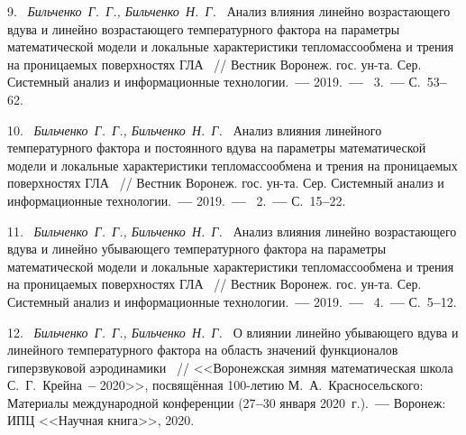 9.~%
\textit%
{Бильченко~Г.~Г.,
 Бильченко~Н.~Г.~}
{%
  {Анализ  влияния
линейно  возрастающего
вдува
и
линейно  возрастающего
температурного  фактора
на  параметры  математической  модели  и
локальные  характеристики  тепломассообмена
и  трения
на  проницаемых  поверхностях  ГЛА}%
~/$\!$/
  Вестник  Воронеж.  гос.  ун-та.
  Сер.  Системный  анализ
  и  информационные  технологии.~{\textbf{---}}
  2019.~{\textbf{---}}
  \No~3.~{\textbf{---}}
  С.~53{\textbf{--}}62.%
  }



10.~%
\textit%
{Бильченко~Г.~Г.,
 Бильченко~Н.~Г.~}
{%
  {Ана\-лиз  влияния
линейного  температурного  фактора
и  постоянного  вдува
на  параметры  математической  модели  и
локальные  характеристики  тепломассообмена
и  трения
на  проницаемых  поверхностях  ГЛА}%
~/$\!$/
  Вестник  Воронеж.  гос.  ун-та.
  Сер.  Системный  анализ
  и  информационные  технологии.~{\textbf{---}}
  2019.~{\textbf{---}}
  \No~2.~{\textbf{---}}
  С.~15{\textbf{--}}22.%
  }



11.~%
\textit%
{Бильченко~Г.~Г.,
 Бильченко~Н.~Г.~}
{%
  {Анализ  влияния
линейно  возрастающего
вдува
и
линейно  убывающего
температурного  фактора
на  параметры  математической  модели  и
локальные  характеристики  тепломассообмена
и  трения
на  проницаемых  поверхностях  ГЛА}%
~/$\!$/
  Вестник  Воронеж.  гос.  ун-та.
  Сер.  Системный  анализ
  и  информационные  технологии.~{\textbf{---}}
  2019.~{\textbf{---}}
  \No~4.~{\textbf{---}}
  С.~5{\textbf{--}}12.%
  }



12.~%
\textit%
{Бильченко~Г.~Г.,
 Бильченко~Н.~Г.~}
{%
  {О  влиянии  линейно  убывающего  вдува
и  линейного  температурного  фактора
на  область  значений  функционалов
гиперзвуковой  аэродинамики}%
~/$\!$/
  <<Воронежская  зимняя  математическая  школа
  С.~Г.~Крейна~{\textbf{--}}  2020>>,
  посвящённая  100-летию
  М.~А.~Красносельского:
  Материалы  международной  конференции
  (27{\textbf{--}}30
  января  2020~г.).~{\textbf{---}}
  Воронеж:  ИПЦ  <<Научная  книга>>,
  2020.%
  }



